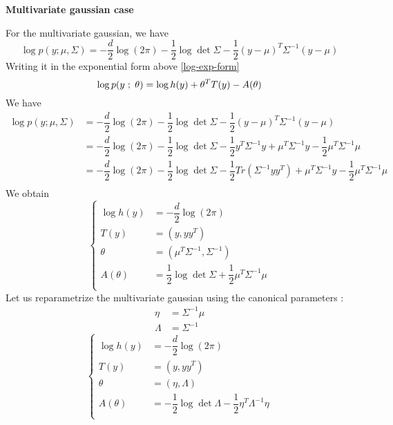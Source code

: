 \documentclass[a4paper, 11pt]{article}
\newcommand{\tr}[1]{Tr\left( #1 \right)}
\newcommand{\ssemi}{\hspace{.3em};\hspace{.3em}}
\begin{document}
\textbf{Multivariate gaussian case}

For the multivariate gaussian, we have
\begin{displaymath}
  \log{p(y ; \mu, \Sigma)} =
  - \dfrac{d}{2} \log(2 \pi)
  - \dfrac{1}{2} \log\det{\Sigma}
  - \dfrac{1}{2} (y - \mu)^T \Sigma^{-1} (y - \mu)
\end{displaymath}
Writing it in the exponential form above \eqref{log-exp-form}
\begin{displaymath}
  \log{ p(y \ssemi \theta) } = \log{h(y)} + \theta^T T(y) - A(\theta)
\end{displaymath}
We have
\begin{align*}
  \log{p(y ; \mu, \Sigma)}
  & =
    - \dfrac{d}{2} \log(2 \pi)
    - \dfrac{1}{2} \log\det{\Sigma}
    - \dfrac{1}{2} (y - \mu)^T \Sigma^{-1} (y - \mu)
  \\
  & =
    - \dfrac{d}{2} \log(2 \pi)
    - \dfrac{1}{2} \log\det{\Sigma}
    - \dfrac{1}{2} y^T \Sigma^{-1} y
    + \mu^T \Sigma^{-1} y
    - \dfrac{1}{2} \mu^T \Sigma^{-1} \mu
  \\
  & =
    - \dfrac{d}{2} \log(2 \pi)
    - \dfrac{1}{2} \log\det{\Sigma}
    - \dfrac{1}{2} \tr{\Sigma^{-1} y y^T}
    + \mu^T \Sigma^{-1} y
    - \dfrac{1}{2} \mu^T \Sigma^{-1} \mu
  \\
\end{align*}
We obtain
\begin{displaymath}
  \left\{
  \begin{array}{rl}
    \log{h(y)} & = - \dfrac{d}{2} \log(2 \pi) \\[.5em]
    T(y) & = (y, y y^T) \\[.5em]
    \theta & = (\mu^T \Sigma^{-1}, \Sigma^{-1}) \\[.5em]
    A(\theta) &= \dfrac{1}{2} \log\det{\Sigma} + \dfrac{1}{2} \mu^T \Sigma^{-1} \mu \\
  \end{array}
  \right.
\end{displaymath}
Let us reparametrize the multivariate gaussian using the canonical
parameters :
\begin{align*}
  \eta & =  \Sigma^{-1} \mu \\
  \Lambda & = \Sigma^{-1}
\end{align*}
\begin{displaymath}
  \left\{
  \begin{array}{rl}
    \log{h(y)} & = - \dfrac{d}{2} \log(2 \pi) \\[.5em]
    T(y) & = (y, y y^T) \\[.5em]
    \theta & = (\eta, \Lambda) \\[.5em]
    A(\theta) &= -\dfrac{1}{2} \log\det{\Lambda} - \dfrac{1}{2} \eta^T \Lambda^{-1} \eta \\
  \end{array}
  \right.
\end{displaymath}
\end{document}
